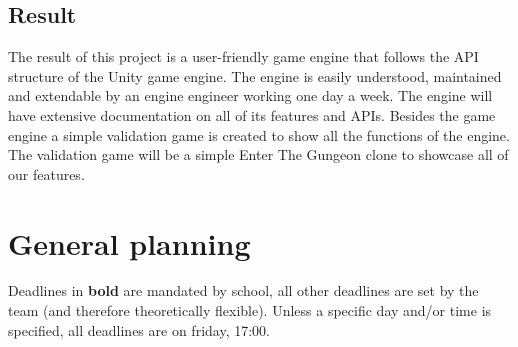 \documentclass{article} %
\begin{document}
\subsection{Result}
The result of this project is a user-friendly game engine that follows the API structure of the Unity game engine.
The engine is easily understood, maintained and extendable by an engine engineer working one day a week.
The engine will have extensive documentation on all of its features and APIs.
\newline\newline
Besides the game engine a simple validation game is created to show all the functions of the engine.
The validation game will be a simple Enter The Gungeon clone to showcase all of our features.
\newpage

\section{General planning} %
Deadlines in \textbf{bold} are mandated by school, all other deadlines are set by the team (and therefore theoretically flexible).
Unless a specific day and/or time is specified, all deadlines are on friday, 17:00.
\end{document}
